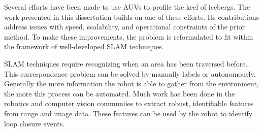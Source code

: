 Several efforts have been made to use AUVs to profile the keel of icebergs. The work presented in this dissertation builds on one of these efforts. Its contributions address issues with speed, scalability, and operational constraints of the prior method. To make these improvements, the problem is reformulated to fit within the framework of well-developed SLAM techniques. 

SLAM techniques require recognizing when an area has been traversed before. This correspondence problem can be solved by manually labels or autonomously. Generally the more information the robot is able to gather from the environment, the more this process can be automated. Much work has been done in the robotics and computer vision communiies to extract robust, identifiable features from range and image data. These features can be used by the robot to identify loop closure events.

